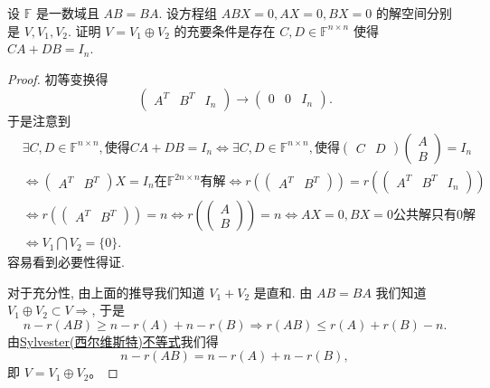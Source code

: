 \documentclass[../../main.tex]{subfiles}%
\begin{document}
\begin{example}
设 \( \mathbb{F} \) 是一数域且 \( AB = BA \). 设方程组 \( ABX = 0, AX = 0, BX = 0 \) 的解空间分别是 \( V, V_1, V_2 \). 证明 \( V = V_1 \oplus V_2 \) 的充要条件是存在 \( C, D \in \mathbb{F}^{n \times n} \) 使得 \( CA + DB = I_n \).
\end{example}
\begin{proof}
初等变换得
\[
\begin{pmatrix} A^T & B^T & I_n \end{pmatrix} \to \begin{pmatrix} 0 & 0 & I_n \end{pmatrix}.
\]
于是注意到
\[
\begin{aligned}
&\exists C, D \in \mathbb{F}^{n \times n}, \text{使得} CA + DB = I_n \iff \exists C, D \in \mathbb{F}^{n \times n}, \text{使得} \begin{pmatrix} C & D \end{pmatrix} \begin{pmatrix} A \\ B \end{pmatrix} = I_n \\
&\iff \begin{pmatrix} A^T & B^T \end{pmatrix} X = I_n \text{在} \mathbb{F}^{2n \times n} \text{有解} \iff r\left( \begin{pmatrix} A^T & B^T \end{pmatrix} \right) = r\left( \begin{pmatrix} A^T & B^T & I_n \end{pmatrix} \right) \\
&\iff r\left( \begin{pmatrix} A^T & B^T \end{pmatrix} \right) = n \iff r\left( \begin{pmatrix} A \\ B \end{pmatrix} \right) = n \iff AX = 0, BX = 0 \text{公共解只有} 0 \text{解} \\
&\iff V_1 \bigcap V_2 = \{0\}.
\end{aligned}
\]
容易看到必要性得证.

对于充分性, 由上面的推导我们知道 \( V_1 + V_2 \) 是直和. 由 \( AB = BA \) 我们知道 \( V_1 \oplus V_2 \subset V \Longrightarrow \), 于是
\[
n-r(AB)\geqslant n-r(A)+n-r(B)\Longrightarrow r(AB)\leqslant r(A)+r(B)-n.
\]
由\hyperref[proposition:Sylvester(西尔维斯特)不等式]{Sylvester(西尔维斯特)不等式}我们得
\[
n - r(AB) = n - r(A) + n - r(B),
\]
即 \( V = V_1 \oplus V_2 \)。
\end{proof}
\end{document}
